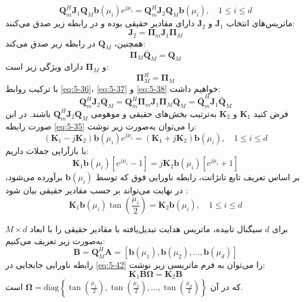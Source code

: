 \begin{equation}
	\bm{Q}_m^H \bm{J}_1 \bm{Q}_M \bm{b}(\mu_i) e^{j\mu_i} = \bm{Q}_m^H \bm{J}_2 \bm{Q}_M \bm{b}(\mu_i), \quad 1 \leq i \leq d
	\label{eq:5-35}
\end{equation}
ماتریس‌های انتخاب $\bm{J}_1$ و $\bm{J}_2$ دارای مقادیر حقیقی بوده و در رابطه زیر صدق می‌کنند:
\begin{equation}
	\bm{J}_2 = \bm{\Pi}_m \bm{J}_1 \bm{\Pi}_M
	\label{eq:5-36}
\end{equation}
همچنین، $\bm{Q}_M$ در رابطه زیر صدق می‌کند:
\begin{equation}
	\bm{\Pi}_M \bar{\bm{Q}}_M = \bm{Q}_M
	\label{eq:5-37}
\end{equation}
و $\bm{\Pi}_M$ دارای ویژگی زیر است:
\begin{equation}
	\bm{\Pi}_M^H = \bm{\Pi}_M
	\label{eq:5-38}
\end{equation}
با ترکیب روابط \eqref{eq:5-36}، \eqref{eq:5-37} و \eqref{eq:5-38} خواهیم داشت:
\begin{equation}
	\bm{Q}_m^H \bm{J}_2 \bm{Q}_M = \bm{Q}_m^H \bm{\Pi}_m \bm{J}_1 \bm{\Pi}_M \bm{Q}_M = \bar{\bm{Q}}_m^H \bm{J}_1 \bar{\bm{Q}}_M
	\label{eq:5-39}
\end{equation}
فرض کنید $\bm{K}_1$ و $\bm{K}_2$ به‌ترتیب بخش‌های حقیقی و موهومی $\bm{Q}_m^H \bm{J}_2 \bm{Q}_M$ باشند. در این صورت رابطه \eqref{eq:5-35} را می‌توان به‌صورت زیر نوشت:
\begin{equation}
	(\bm{K}_1 - j\bm{K}_2) \bm{b}(\mu_i) e^{j\mu_i} = (\bm{K}_1 + j\bm{K}_2) \bm{b}(\mu_i), \quad 1 \leq i \leq d
	\label{eq:5-40}
\end{equation}
با بازآرایی جملات داریم:
\begin{equation}
	\bm{K}_1 \bm{b}(\mu_i) [e^{j\mu_i} - 1] = j\bm{K}_2 \bm{b}(\mu_i) [e^{j\mu_i} + 1]
	\label{eq:5-41}
\end{equation}
بر اساس تعریف تابع تانژانت، رابطه ناورایی فوق که توسط $\bm{b}(\mu_i)$ برآورده می‌شود، در نهایت می‌تواند بر حسب مقادیر حقیقی بیان شود \cite{5-6}:
\begin{equation}
	\bm{K}_1 \bm{b}(\mu_i) \tan\left(\frac{\mu_i}{2}\right) = \bm{K}_2 \bm{b}(\mu_i), \quad 1 \leq i \leq d
	\label{eq:5-42}
\end{equation}

برای $d$ سیگنال تابیده، ماتریس هدایت تبدیل‌یافته با مقادیر حقیقی را با ابعاد $M \times d$ به‌صورت زیر تعریف می‌کنیم:
\begin{equation}
	\bm{B} = \bm{Q}_M^H \bm{A} = [\bm{b}(\mu_1), \bm{b}(\mu_2), \dots, \bm{b}(\mu_d)]
	\label{eq:5-43}
\end{equation}
رابطه ناورایی جابجایی در \eqref{eq:5-42} را می‌توان به فرم ماتریسی زیر نوشت:
\begin{equation}
	\bm{K}_1 \bm{B} \bm{\Omega} = \bm{K}_2 \bm{B}
	\label{eq:5-44}
\end{equation}
که در آن $\bm{\Omega} = \text{diag}\left\{ \tan\left(\frac{\mu_1}{2}\right), \tan\left(\frac{\mu_2}{2}\right), \dots, \tan\left(\frac{\mu_d}{2}\right) \right\}$ است.

